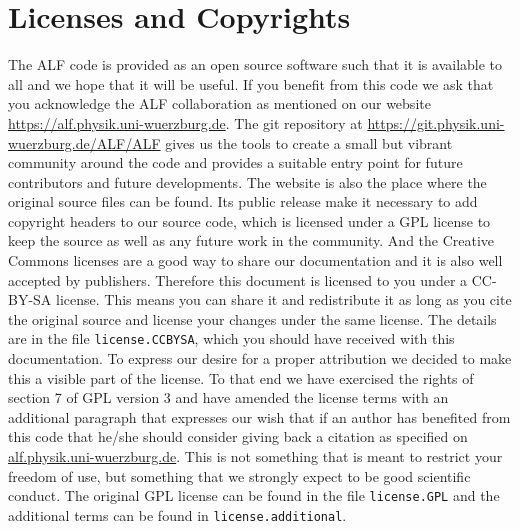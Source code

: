 

\section{Licenses and Copyrights}

The  ALF code  is provided as an open source software  such that it is  available  to all and we  hope that  it 
will be useful.  If you benefit from this code  we ask that you acknowledge  the ALF collaboration  as mentioned on our website \url{https://alf.physik.uni-wuerzburg.de}.  The git repository at \url{https://git.physik.uni-wuerzburg.de/ALF/ALF} gives us the tools to create a small but vibrant community around the code and provides a suitable entry point for future contributors  and future developments. 
The website is also the place where the original source files can be found.
Its public release make it necessary to add copyright headers to our source code, which is licensed under a GPL license to keep the source as well as any future work in the community. And the Creative Commons licenses are a good way to share our documentation and it is also well accepted by publishers. Therefore this document is licensed to you under a CC-BY-SA license.
This means you can share it and redistribute it as long as you cite the original source and license your changes under the same license. The details are in the file \texttt{license.CCBYSA}, which you should have received with this documentation.
To express our desire for a proper attribution we decided to make this a visible part of the license.
To that end we have exercised the rights of section 7 of GPL version 3 and have amended the license terms with an additional paragraph that expresses our wish that if an author has benefited from this code
that he/she should consider giving back a citation as specified on \url{alf.physik.uni-wuerzburg.de}.
This is not something that is meant to restrict your freedom of use, but something that we strongly expect to be good scientific conduct.
The original GPL license can be found in the file \texttt{license.GPL} and the additional terms can be found in \texttt{license.additional}.
